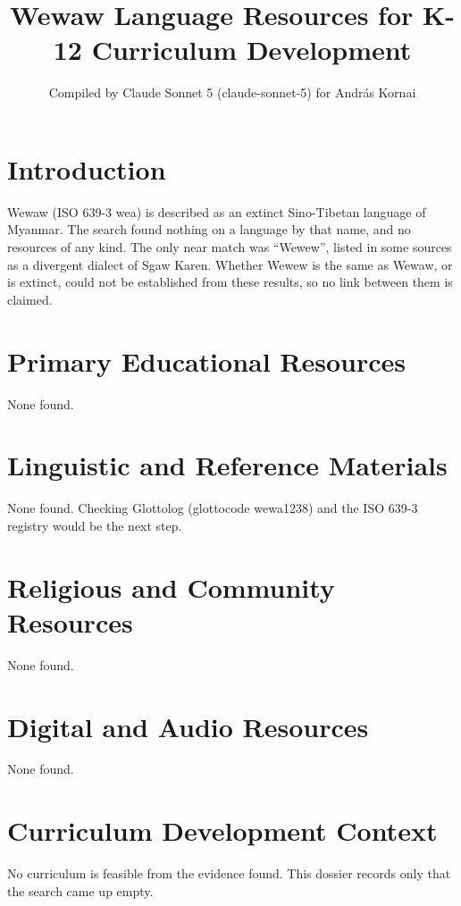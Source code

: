 \documentclass[12pt]{article}
\title{Wewaw Language Resources for K-12 Curriculum Development}
\author{Compiled by Claude Sonnet 5 (claude-sonnet-5) for Andr\'as Kornai}
\date{}
\begin{document}
\maketitle

\section{Introduction}
Wewaw (ISO 639-3 wea) is described as an extinct Sino-Tibetan language of Myanmar. The search found nothing on a language by that name, and no resources of any kind. The only near match was ``Wewew'', listed in some sources as a divergent dialect of Sgaw Karen. Whether Wewew is the same as Wewaw, or is extinct, could not be established from these results, so no link between them is claimed.

\section{Primary Educational Resources}
None found.

\section{Linguistic and Reference Materials}
None found. Checking Glottolog (glottocode wewa1238) and the ISO 639-3 registry would be the next step.

\section{Religious and Community Resources}
None found.

\section{Digital and Audio Resources}
None found.

\section{Curriculum Development Context}
No curriculum is feasible from the evidence found. This dossier records only that the search came up empty.
\end{document}
